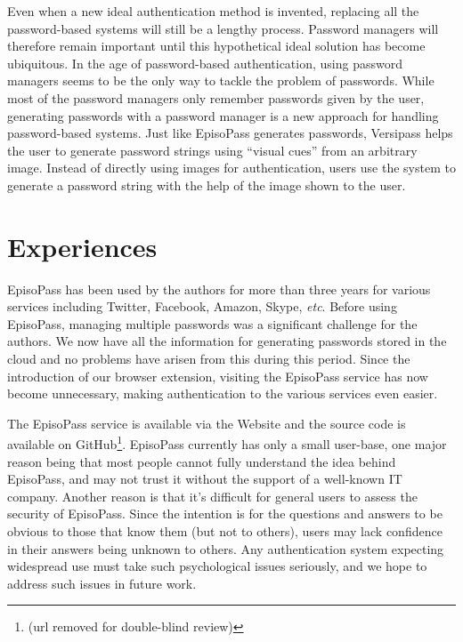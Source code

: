 \documentclass[runningheads,a4paper]{llncs}
\begin{document}
Even when a new ideal authentication method is invented,
replacing all the password-based systems will still be a lengthy process. 
Password managers will therefore remain important until this hypothetical
ideal solution has become ubiquitous.
In the age of password-based authentication,
using password managers seems to be the only way to tackle
the problem of passwords.
%
While most of the password managers only remember passwords given by the user,
generating passwords with a password manager is a new approach for
handling password-based systems.
Just like EpisoPass generates passwords,
Versipass \cite{Stobert:2014:PMD:2683467.2683471} %
helps the user to generate password strings
using ``visual cues'' from an arbitrary image.
Instead of directly using images for authentication,
users use the system to generate a password string with the help of
the image shown to the user.

% 
% 
%

\section{Experiences}

EpisoPass has been used by the authors for more than three years
for various services including Twitter, Facebook, Amazon, Skype, {\it etc}.
%
Before using EpisoPass, managing multiple passwords was a significant challenge
for the authors. We now have all the information for generating passwords 
stored in the cloud and no problems have arisen from this during this period.
%
Since the introduction of our browser extension, visiting the EpisoPass 
service has now become unnecessary, making authentication to the various
services even easier.

The EpisoPass service is available via the Website and the source code is
available on GitHub\footnote{
  (url removed for double-blind review)
}. EpisoPass currently has only a small user-base, one major
reason being that most people cannot fully understand the
idea behind EpisoPass, and may not trust it without the 
support of a well-known IT company.
Another reason is that it's difficult for general users to 
assess the security of EpisoPass.
Since the intention is for the questions and answers to be obvious
to those that know them (but not to others), users may lack
confidence in their answers being unknown to others.
Any authentication system expecting widespread use must take
such psychological issues seriously, and we hope to address 
such issues in future work.
\end{document}

